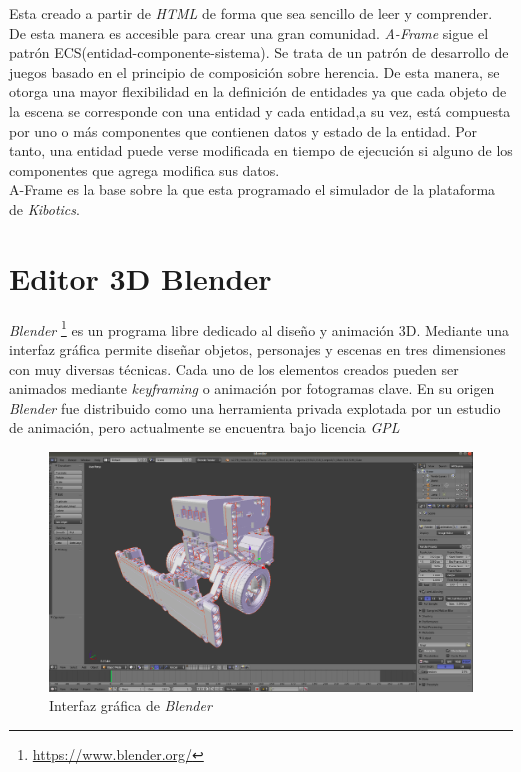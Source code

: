 Esta creado a partir de \textit{HTML} de forma que sea sencillo de leer y comprender. De esta manera es accesible para crear una gran comunidad. \textit{A-Frame} sigue el patrón ECS(entidad-componente-sistema). Se trata de un patrón de desarrollo de juegos basado en el principio de composición sobre herencia. De esta manera, se otorga una mayor flexibilidad en la definición de entidades ya que cada objeto de la escena se corresponde con una entidad y cada entidad,a su vez, está compuesta por uno o más componentes que contienen datos y estado de la entidad. Por tanto, una entidad puede verse modificada en tiempo de ejecución si alguno de los componentes que agrega modifica sus datos.
\\
A-Frame es la base sobre la que esta programado el simulador de la plataforma de \textit{Kibotics}.


\section{Editor 3D Blender}
\label{sec:blender}
\textit{Blender} \footnote{\url{https://www.blender.org/}} es un programa libre dedicado al diseño y animación 3D. Mediante una interfaz gráfica permite diseñar objetos, personajes y escenas en tres dimensiones con muy diversas técnicas. Cada uno de los elementos creados pueden ser animados mediante \textit{keyframing} o animación por fotogramas clave. En su origen \textit{Blender} fue distribuido como una herramienta privada explotada por un estudio de animación, pero actualmente se encuentra bajo licencia \textit{GPL} 

    
\begin{figure}[ht]
    \centering
    \includegraphics[width=1\textwidth]{img/primermodelo.png}
    \caption{Interfaz gráfica de \textit{Blender}} 
    \label{fig:blender}
\end{figure}

